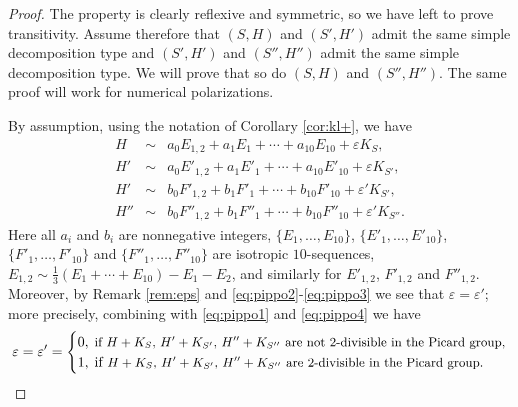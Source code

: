 \documentclass[11pt]{amsart}
\theoremstyle{definition}
\begin{document}
\begin{proof}
The property is clearly reflexive and symmetric, so we have left to prove transitivity. Assume therefore that $(S,H)$ and $(S',H')$ admit the same simple decomposition type and
$(S',H')$ and $(S'',H'')$ admit the same simple decomposition type. We will prove that so do
$(S,H)$ and $(S'',H'')$. The same proof will  work  for numerical polarizations. 


 By assumption, using the notation of Corollary \ref{cor:kl+}, we have 
  \begin{eqnarray}
 \label{eq:pippo1}   H  & \sim &  a_0E_{1,2}+a_1E_1+\cdots+a_{10}E_{10} + \varepsilon K_S,  \\
 \label{eq:pippo2}   H'  & \sim &  a_0E'_{1,2}+a_1E'_1+\cdots+a_{10}E'_{10} + \varepsilon K_{S'},  \\
\label{eq:pippo3}  H' & \sim &  
           b_0F'_{1,2}+b_1F'_1+\cdots+b_{10}F'_{10} + \varepsilon' K_{S'}, \\
\label{eq:pippo4}      H''  & \sim &   b_0F''_{1,2}+b_1F''_1+\cdots+b_{10}F''_{10} + \varepsilon' K_{S''}.
  \end{eqnarray}
Here all $a_i$ and $b_i$ are nonnegative integers, $\{E_1,\ldots,E_{10}\}$, $\{E'_1,\ldots,E'_{10}\}$,
 $\{F'_1,\ldots,F'_{10}\}$ and $\{F''_1,\ldots,F''_{10}\}$  are isotropic $10$-sequences, $E_{1,2} \sim \frac{1}{3}(E_1+ \cdots +E_{10})-E_1-E_2$, 
and similarly for $E'_{1,2}$, $F'_{1,2}$ and $F''_{1,2}$. Moreover, by 
Remark \ref{rem:eps} and \eqref{eq:pippo2}-\eqref{eq:pippo3} we see that $\varepsilon=\varepsilon'$; more precisely, combining with \eqref{eq:pippo1} and \eqref{eq:pippo4} we have 
\begin{equation} \label{eq:eps22}
\varepsilon=\varepsilon'= \begin{cases} 0, & \hspace{-0.2cm} \mbox{\small{if $H+K_S$, $H'+K_{S'}$, $H''+K_{S''}$ are not $2$-divisible in the Picard group,}} \\
1, & \hspace{-0.2cm} \mbox{if \small{$H+K_S$, $H'+K_{S'}$, $H''+K_{S''}$ are  $2$-divisible in the Picard group.}} 
\end{cases}
\end{equation} 



\end{proof}
\end{document}
